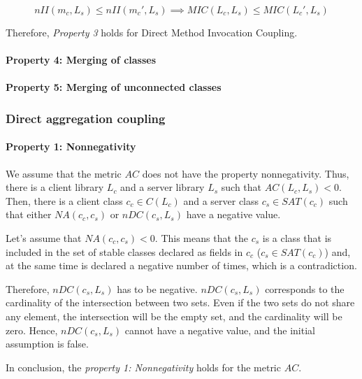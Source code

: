 \begin{equation*}
   nII(m_c, L_s) \le nII(m_c', L_s) \implies MIC(L_c, L_s) \le MIC(L_c', L_s)
\end{equation*}

\blankls
Therefore, \textit{Property 3} holds for Direct Method Invocation Coupling.

\paragraph{Property 4: Merging of classes}

\paragraph{Property 5: Merging of unconnected classes}

\subsubsection{Direct aggregation coupling}
\paragraph{Property 1: Nonnegativity}
We assume that the metric $AC$ does not have the property nonnegativity. Thus, there is a client library $L_c$ and a server library $L_s$ such that $AC(L_c, L_s) < 0$. Then, there is a client class $c_c \in C(L_c)$ and a server class $c_s \in SAT(c_c)$ such that either $NA(c_c, c_s)$ or $nDC(c_s, L_s)$ have a negative value.

Let's assume that $NA(c_c, c_s) < 0$. This means that the $c_s$ is a class that is included in the set of stable classes declared as fields in $c_c$ ($c_s \in SAT(c_c)$) and, at the same time is declared a negative number of times, which is a contradiction.

Therefore, $nDC(c_s, L_s)$ has to be negative. $nDC(c_s, L_s)$ corresponds to the cardinality of the intersection between two sets. Even if the two sets do not share any element, the intersection will be the empty set, and the cardinality will be zero. Hence, $nDC(c_s, L_s)$ cannot have a negative value, and the initial assumption is false.

In conclusion, the \textit{property 1: Nonnegativity} holds for the metric $AC$.

